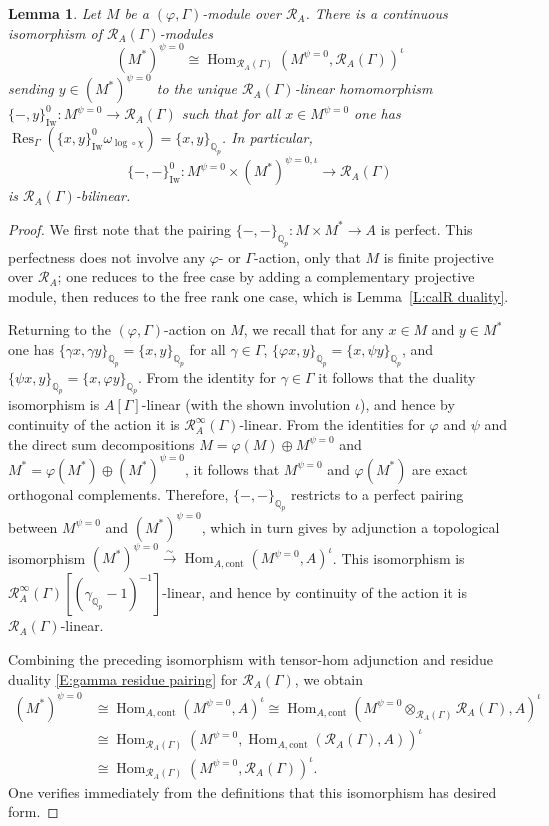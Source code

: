 \documentclass[12pt]{article}
\newtheorem{lemma}[theorem]{Lemma}
\theoremstyle{definition}
\numberwithin{equation}{theorem}
\newcommand{\calR}{\mathcal{R}}
\newcommand{\QQ}{\mathbb{Q}}
\newcommand{\cont}{\mathrm{cont}}
\newcommand{\Iw}{\mathrm{Iw}}
\def\Qp{\QQ_p}
\DeclareMathOperator{\Hom}{Hom}
\DeclareMathOperator{\Res}{Res}
\begin{document}
\begin{lemma}
Let $M$ be a $(\varphi, \Gamma)$-module over $\calR_A$.  There is a
continuous isomorphism of $\calR_A(\Gamma)$-modules
\begin{equation}\label{E:D^psi=0 duality}
(M^*)^{\psi=0} \cong \Hom_{\calR_A(\Gamma)}(M^{\psi=0}, \calR_A(\Gamma))^\iota
\end{equation}
sending $y \in (M^*)^{\psi=0}$ to the unique $\calR_A(\Gamma)$-linear
homomorphism $\{-,y\}_\Iw^0: M^{\psi=0} \to \calR_A(\Gamma)$ such that
for all $x \in M^{\psi=0}$ one has
$\Res_\Gamma(\{x,y\}_\Iw^0\omega_{\log\circ\chi}) = \{x,y\}_{\Qp}$.
In particular,
\[
\{-,-\}_\Iw^0: M^{\psi=0} \times (M^*)^{\psi=0,\iota} \to \calR_A(\Gamma)
\]
is $\calR_A(\Gamma)$-bilinear.
\end{lemma}
\begin{proof}
We first note that the pairing $\{-,-\}_{\Qp}: M \times M^* \to A$ is
perfect.  This perfectness does not involve any $\varphi$- or
$\Gamma$-action, only that $M$ is finite projective over $\calR_A$;
one reduces to the free case by adding a complementary projective
module, then reduces to the free rank one case, which is
Lemma~\ref{L:calR duality}.

Returning to the $(\varphi,\Gamma)$-action on $M$, we recall that for
any $x \in M$ and $y \in M^*$ one has $\{\gamma x, \gamma y\}_{\Qp} =
\{x,y\}_{\Qp}$ for all $\gamma \in \Gamma$, $\{\varphi x, y\}_{\Qp} =
\{x, \psi y\}_{\Qp}$, and $\{\psi x, y\}_{\Qp} = \{x, \varphi
y\}_{\Qp}$.  From the identity for $\gamma \in \Gamma$ it follows that
the duality isomorphism is $A[\Gamma]$-linear (with the shown
involution $\iota$), and hence by continuity of the action it is
$\calR_A^\infty(\Gamma)$-linear.  From the identities for $\varphi$
and $\psi$ and the direct sum decompositions $M = \varphi(M) \oplus
M^{\psi=0}$ and $M^* = \varphi(M^*) \oplus (M^*)^{\psi=0}$, it follows
that $M^{\psi=0}$ and $\varphi(M^*)$ are exact orthogonal complements.
Therefore, $\{-,-\}_{\Qp}$ restricts to a perfect pairing between
$M^{\psi=0}$ and $(M^*)^{\psi=0}$, which in turn gives by adjunction a
topological isomorphism $(M^*)^{\psi=0} \stackrel\sim\to
\Hom_{A,\cont}(M^{\psi=0},A)^\iota$.  This isomorphism is
$\calR_A^\infty(\Gamma)[(\gamma_{\Qp}-1)^{-1}]$-linear, and hence by
continuity of the action it is $\calR_A(\Gamma)$-linear.

Combining the preceding isomorphism with tensor-hom adjunction and
residue duality \eqref{E:gamma residue pairing} for $\calR_A(\Gamma)$,
we obtain
\begin{align}
\nonumber
(M^*)^{\psi=0}
&\cong \Hom_{A,\cont}(M^{\psi=0}, A)^\iota
 \cong \Hom_{A,\cont}(M^{\psi=0} \otimes_{\calR_A(\Gamma)} \calR_A(\Gamma), A)^\iota \\
\label{E:partial duality}
&\cong \Hom_{\calR_A(\Gamma)}(M^{\psi=0}, \Hom_{A, \cont}(\calR_A(\Gamma), A))^\iota\\
\nonumber
&\cong\Hom_{\calR_A(\Gamma)}(M^{\psi=0}, \calR_A(\Gamma))^\iota.
\end{align}
One verifies immediately from the definitions that this isomorphism
has desired form.
\end{proof}
\end{document}
